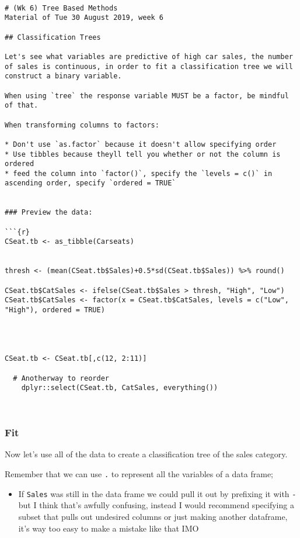 \documentclass[12pt]{article}
\newcommand{\passthrough}[1]{#1}
\providecommand{\tightlist}{%
  \setlength{\itemsep}{0pt}\setlength{\parskip}{0pt}}
\begin{document}
\begin{lstlisting}

# (Wk 6) Tree Based Methods
Material of Tue 30 August 2019, week 6

## Classification Trees

Let's see what variables are predictive of high car sales, the number of sales is continuous, in order to fit a classification tree we will construct a binary variable.

When using `tree` the response variable MUST be a factor, be mindful of that.

When transforming columns to factors:

* Don't use `as.factor` because it doesn't allow specifying order
* Use tibbles because theyll tell you whether or not the column is ordered
* feed the column into `factor()`, specify the `levels = c()` in ascending order, specify `ordered = TRUE`


### Preview the data:

```{r}
CSeat.tb <- as_tibble(Carseats)


thresh <- (mean(CSeat.tb$Sales)+0.5*sd(CSeat.tb$Sales)) %>% round()

CSeat.tb$CatSales <- ifelse(CSeat.tb$Sales > thresh, "High", "Low")
CSeat.tb$CatSales <- factor(x = CSeat.tb$CatSales, levels = c("Low", "High"), ordered = TRUE)




CSeat.tb <- CSeat.tb[,c(12, 2:11)]
    
  # Anotherway to reorder
    dplyr::select(CSeat.tb, CatSales, everything())
    
    
\end{lstlisting}

\hypertarget{fit}{%
\subsubsection{Fit}\label{fit}}

Now let's use all of the data to create a classification tree of the
sales category.

Remember that we can use \passthrough{\lstinline!.!} to represent all
the variables of a data frame;

\begin{itemize}
\tightlist
\item
  If \passthrough{\lstinline!Sales!} was still in the data frame we
  could pull it out by prefixing it with \passthrough{\lstinline!-!} but
  I think that's awfully confusing, instead I would recommend specifying
  a subset that pulls out undesired columns or just making another
  dataframe, it's way too easy to make a mistake like that IMO
\end{itemize}
\end{document}
